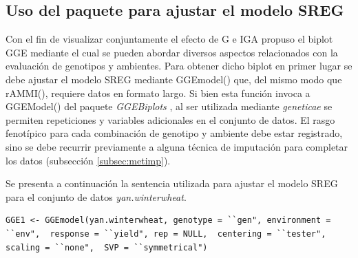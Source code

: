 \subsection{Uso del paquete para ajustar el modelo SREG}
\label{subsec:SREGpaquete}
Con el fin de visualizar conjuntamente el efecto de G e IGA \citet{Yanetal2000} propuso el biplot GGE mediante el cual se pueden abordar diversos aspectos relacionados con la evaluación de genotipos y ambientes. Para obtener dicho biplot en primer lugar se debe ajustar el modelo SREG mediante \textcolor{fandango}{GGEmodel()} que, del mismo modo que \textcolor{fandango}{rAMMI()}, requiere datos en formato largo. Si bien esta función invoca a \textcolor{fandango}{GGEModel()} del paquete \emph{GGEBiplots} \citep{Dumble2017}, al ser utilizada mediante \emph{geneticae} se permiten repeticiones y variables adicionales en el conjunto de datos. El rasgo fenotípico para cada combinación de genotipo y ambiente debe estar registrado, sino se debe recurrir previamente a alguna técnica de imputación para completar los datos (subsección \ref{subsec:metimp}). 

Se presenta a continuación la sentencia utilizada para ajustar el modelo SREG para el conjunto de datos \emph{yan.winterwheat}.

\begin{center}
\begin{tcolorbox}[colframe=aurometalsaurus,colback=backcolour,colbacklower=white,
   				width=1\linewidth,
    			height=0.08\linewidth,
    			boxsep=-3mm]
\begin{lstlisting}
GGE1 <- GGEmodel(yan.winterwheat, genotype = ``gen", environment = ``env",  response = ``yield", rep = NULL,  centering = ``tester", scaling = ``none",  SVP = ``symmetrical")
\end{lstlisting}
\end{tcolorbox}
\end{center}

